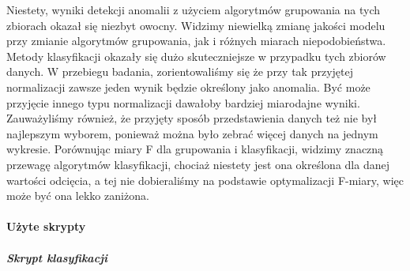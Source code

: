 \documentclass[
]{article}
\begin{document}
Niestety, wyniki detekcji anomalii z użyciem algorytmów grupowania na
tych zbiorach okazał się niezbyt owocny. Widzimy niewielką zmianę
jakości modelu przy zmianie algorytmów grupowania, jak i różnych miarach
niepodobieństwa. Metody klasyfikacji okazały się dużo skuteczniejsze w
przypadku tych zbiorów danych. W przebiegu badania, zorientowaliśmy się
że przy tak przyjętej normalizacji zawsze jeden wynik będzie określony
jako anomalia. Być może przyjęcie innego typu normalizacji dawałoby
bardziej miarodajne wyniki. Zauważyliśmy również, że przyjęty sposób
przedstawienia danych też nie był najlepszym wyborem, ponieważ można
było zebrać więcej danych na jednym wykresie. Porównując miary F dla
grupowania i klasyfikacji, widzimy znaczną przewagę algorytmów
klasyfikacji, chociaż niestety jest ona określona dla danej wartości
odcięcia, a tej nie dobieraliśmy na podstawie optymalizacji F-miary,
więc może być ona lekko zaniżona.

\hypertarget{uux17cyte-skrypty}{%
\paragraph{Użyte skrypty}\label{uux17cyte-skrypty}}

\hypertarget{skrypt-klasyfikacji}{%
\subparagraph{Skrypt klasyfikacji}\label{skrypt-klasyfikacji}}
\end{document}
